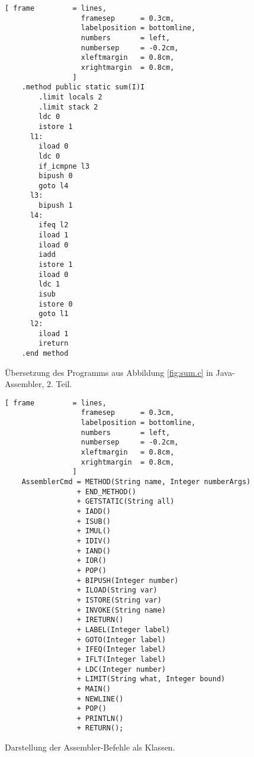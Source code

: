 \begin{figure}[!ht]
\centering
\begin{Verbatim}[ frame         = lines, 
                  framesep      = 0.3cm, 
                  labelposition = bottomline,
                  numbers       = left,
                  numbersep     = -0.2cm,
                  xleftmargin   = 0.8cm,
                  xrightmargin  = 0.8cm,
                ]
    .method public static sum(I)I
        .limit locals 2
        .limit stack 2
        ldc 0
        istore 1
      l1:
        iload 0
        ldc 0
        if_icmpne l3
        bipush 0
        goto l4
      l3:
        bipush 1
      l4:
        ifeq l2
        iload 1
        iload 0
        iadd
        istore 1
        iload 0
        ldc 1
        isub
        istore 0
        goto l1
      l2:
        iload 1
        ireturn
    .end method
\end{Verbatim}
\vspace*{-0.3cm}
\caption{\"Ubersetzung des Programms aus Abbildung \ref{fig:sum.c} in Java-Assembler, 2. Teil.}
\label{fig:sum.jas-2}
\end{figure}



\begin{figure}[!ht]
\centering
\begin{Verbatim}[ frame         = lines, 
                  framesep      = 0.3cm, 
                  labelposition = bottomline,
                  numbers       = left,
                  numbersep     = -0.2cm,
                  xleftmargin   = 0.8cm,
                  xrightmargin  = 0.8cm,
                ]
    AssemblerCmd = METHOD(String name, Integer numberArgs)    
                 + END_METHOD()    
                 + GETSTATIC(String all)
                 + IADD()
                 + ISUB()
                 + IMUL()
                 + IDIV()
                 + IAND()
                 + IOR()
                 + POP()
                 + BIPUSH(Integer number)
                 + ILOAD(String var)
                 + ISTORE(String var)
                 + INVOKE(String name)
                 + IRETURN()
                 + LABEL(Integer label)
                 + GOTO(Integer label)
                 + IFEQ(Integer label)
                 + IFLT(Integer label)
                 + LDC(Integer number)
                 + LIMIT(String what, Integer bound)
                 + MAIN()    
                 + NEWLINE()
                 + POP()
                 + PRINTLN()
                 + RETURN();
\end{Verbatim}
\vspace*{-0.3cm}
\caption{Darstellung der Assembler-Befehle als Klassen.}
\label{fig:program.ep-2} 
\end{figure}

